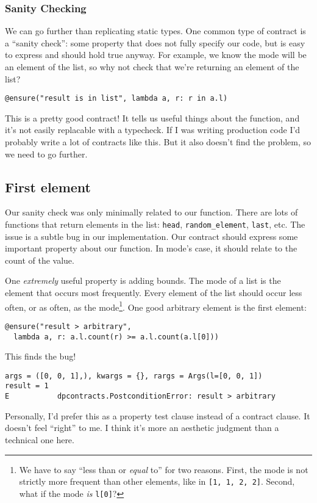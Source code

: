 \subsubsection{Sanity Checking}\label{sanity-checking}

We can go further than replicating static types. One common type of
contract is a ``sanity check'': some property that does not fully
specify our code, but is easy to express and should hold true anyway.
For example, we know the mode will be an element of the list, so why not
check that we're returning an element of the list?

\begin{verbatim}
@ensure("result is in list", lambda a, r: r in a.l)
\end{verbatim}
This is a pretty good contract! It tells us useful things about the
function, and it's not easily replacable with a typecheck. If I was
writing production code I'd probably write a lot of contracts like this.
But it also doesn't find the problem, so we need to go further.

\subsection{First element}\label{first-element}

Our sanity check was only minimally related to our function. There are
lots of functions that return elements in the list: \texttt{head},
\texttt{random\_element}, \texttt{last}, etc. The issue is a subtle bug
in our implementation. Our contract should express some important
property about our function. In mode's case, it should relate to the
count of the value.

One \emph{extremely} useful property is adding bounds. The mode of a
list is the element that occurs most frequently. Every element of the
list should occur less often, or as often, as the
mode\footnote{We have to say ``less than or \textit{equal} to'' for two reasons. First, the mode is not strictly more frequent than other elements, like in \texttt{[1, 1, 2, 2]}. Second, what if the mode \textit{is} \texttt{l[0]}?}.
One good arbitrary element is the first element:

\begin{verbatim}
@ensure("result > arbitrary", 
  lambda a, r: a.l.count(r) >= a.l.count(a.l[0]))
\end{verbatim}
This finds the bug!

\begin{verbatim}
args = ([0, 0, 1],), kwargs = {}, rargs = Args(l=[0, 0, 1])
result = 1
E           dpcontracts.PostconditionError: result > arbitrary
\end{verbatim}
Personally, I'd prefer this as a property test clause instead of a
contract clause. It doesn't feel ``right'' to me. I think it's more an
aesthetic judgment than a technical one here.

